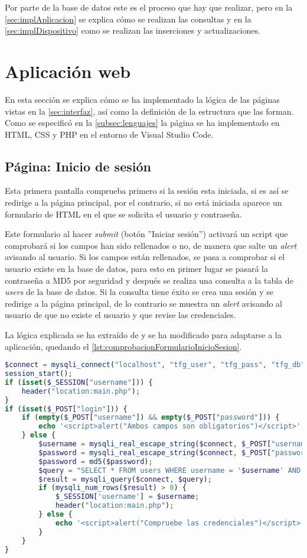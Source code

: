 Por parte de la base de datos este es el proceso que hay que realizar, pero en la \autoref{sec:implAplicacion} se explica cómo se realizan las consultas y en la \autoref{sec:implDispositivo} como se realizan las inserciones y actualizaciones.

\section{Aplicación web}\label{sec:implAplicacion}
En esta sección se explica cómo se ha implementado la lógica de las páginas vistas en la \autoref{sec:interfaz}, así como la definición de la estructura que las forman. Como se especificó en la \autoref{subsec:lenguajes} la página se ha implementado en HTML, CSS y PHP en el entorno de Visual Studio Code.

\subsection{Página: Inicio de sesión}
Esta primera pantalla comprueba primero si la sesión esta iniciada, si es así se redirige a la página principal, por el contrario, si no está iniciada aparece un formulario de HTML en el que se solicita el usuario y contraseña. 

Este formulario al hacer \textit{submit} (botón ''Iniciar sesión'') activará un script que comprobará si los campos han sido rellenados o no, de manera que salte un \textit{alert} avisando al usuario. Si los campos están rellenados, se pasa a comprobar si el usuario existe en la base de datos, para esto en primer lugar se pasará la contraseña a MD5 por seguridad y después se realiza una consulta a la tabla de \textit{users} de la base de datos. Si la consulta tiene éxito se crea una sesión y se redirige a la página principal, de lo contrario se muestra un \textit{alert} avisando al usuario de que no existe el usuario y que revise las credenciales.

La lógica explicada se ha extraído de \cite{webslesson_php_nodate} y se ha modificado para adaptarse a la aplicación, quedando el \autoref{lst:comprobacionFormularioInicioSesion}.
\begin{lstlisting}[language=PHP, caption=Comprobación formulario Inicio de sesión, label=lst:comprobacionFormularioInicioSesion]
$connect = mysqli_connect("localhost", "tfg_user", "tfg_pass", "tfg_db");
session_start();
if (isset($_SESSION["username"])) {
    header("location:main.php");
}
if (isset($_POST["login"])) {
    if (empty($_POST["username"]) && empty($_POST["password"])) {
        echo '<script>alert("Ambos campos son obligatorios")</script>';
    } else {
        $username = mysqli_real_escape_string($connect, $_POST["username"]);
        $password = mysqli_real_escape_string($connect, $_POST["password"]);
        $password = md5($password);
        $query = "SELECT * FROM users WHERE username = '$username' AND password = '$password'";
        $result = mysqli_query($connect, $query);
        if (mysqli_num_rows($result) > 0) {
            $_SESSION['username'] = $username;
            header("location:main.php");
        } else {
            echo '<script>alert("Compruebe las credenciales")</script>';
        }
    }
}
\end{lstlisting}

